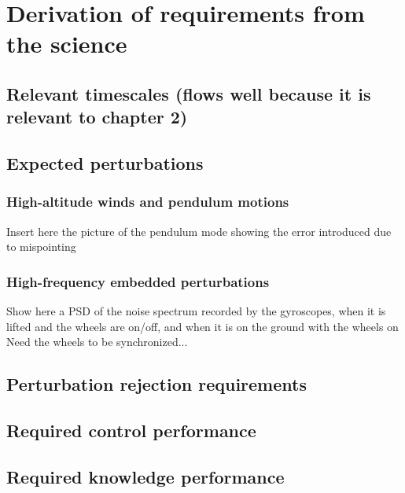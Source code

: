 \section{Derivation of requirements from the science}


\subsection{	Relevant timescales (flows well because it is relevant to chapter 2)}
\subsection{	Expected perturbations}
\subsubsection{	High-altitude winds and pendulum motions}
Insert here the picture of the pendulum mode showing the error introduced due to mispointing
\subsubsection{	High-frequency embedded perturbations}
Show here a PSD of the noise spectrum recorded by the gyroscopes, when it is lifted and the wheels are on/off, and when it is on the ground with the wheels on
Need the wheels to be synchronized...
\subsection{	Perturbation rejection requirements }
\subsection{	Required control performance}
\subsection{	Required knowledge performance}

